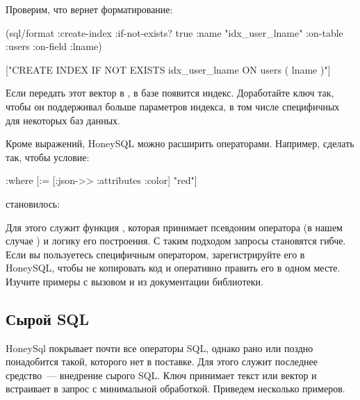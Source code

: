 Проверим, что вернет форматирование:

\begin{english}
  \begin{clojure}
(sql/format {:create-index {:if-not-exists? true
                            :name "idx_user_lname"
                            :on-table :users
                            :on-field :lname}})

["CREATE INDEX IF NOT EXISTS idx_user_lname
  ON users ( lname )"]
  \end{clojure}
\end{english}

Если передать этот вектор в , в базе появится индекс. Доработайте ключ  так, чтобы он поддерживал больше параметров индекса, в том числе специфичных для некоторых баз данных.

Кроме выражений, HoneySQL можно расширить операторами. Например, сделать так, чтобы условие:

\begin{english}
  \begin{clojure}
{:where [:= [:json->> :attributes :color] "red"]}
  \end{clojure}
\end{english}

\noindent
становилось:

\begin{english}
  \begin{clojure}
["... WHERE attributes ->> 'color' = ?" "red"]
  \end{clojure}
\end{english}

Для этого служит функция , которая принимает псевдоним оператора (в нашем случае ) и логику его построения. С таким подходом запросы становятся гибче. Если вы пользуетесь специфичным оператором, зарегистрируйте его в HoneySQL, чтобы не копировать код и оперативно править его в одном месте. Изучите примеры с вызовом  и  из документации библиотеки.

\subsection{Сырой SQL}

HoneySql покрывает почти все операторы SQL, однако рано или поздно понадобится такой, которого нет в поставке. Для этого служит последнее средство~--- внедрение сырого SQL. Ключ  принимает текст или вектор и встраивает в запрос с минимальной обработкой. Приведем несколько примеров.

